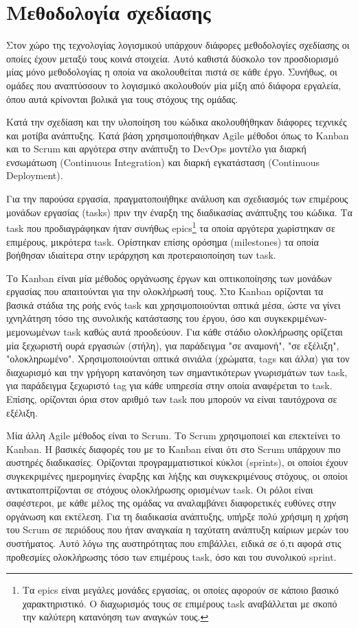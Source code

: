 \section{Μεθοδολογία σχεδίασης} \label{section:3-3-design-methodology}

Στον χώρο της τεχνολογίας λογισμικού υπάρχουν διάφορες μεθοδολογίες σχεδίασης οι οποίες έχουν μεταξύ τους κοινά στοιχεία. Αυτό καθιστά δύσκολο τον προσδιορισμό μίας μόνο μεθοδολογίας η οποία να ακολουθείται πιστά σε κάθε έργο. Συνήθως, οι ομάδες που αναπτύσσουν το λογισμικό ακολουθούν μία μίξη από διάφορα εργαλεία, όπου αυτά κρίνονται βολικά για τους στόχους της ομάδας. %

Κατά την σχεδίαση και την υλοποίηση του κώδικα ακολουθήθηκαν διάφορες τεχνικές και μοτίβα ανάπτυξης. Κατά βάση χρησιμοποιήθηκαν Agile μέθοδοι όπως το Kanban και το Scrum και αργότερα στην ανάπτυξη το DevOps μοντέλο για διαρκή ενσωμάτωση (Continuous Integration) και διαρκή εγκατάσταση (Continuous Deployment).

Για την παρούσα εργασία, πραγματοποιήθηκε ανάλυση και σχεδιασμός των επιμέρους μονάδων εργασίας (tasks) πριν την έναρξη της διαδικασίας ανάπτυξης του κώδικα. Τα task που προδιαγράφηκαν ήταν συνήθως epics\footnote{Τα epics είναι μεγάλες μονάδες εργασίας, οι οποίες αφορούν σε κάποιο βασικό χαρακτηριστικό. Ο διαχωρισμός τους σε επιμέρους task αναβάλλεται με σκοπό την καλύτερη κατανόηση των αναγκών τους.} τα οποία αργότερα χωρίστηκαν σε επιμέρους, μικρότερα task. Ορίστηκαν επίσης ορόσημα (milestones) τα οποία βοήθησαν ιδιαίτερα στην ιεράρχηση και προτεραιοποίηση των task.

Το Kanban είναι μία μέθοδος οργάνωσης έργων και οπτικοποίησης των μονάδων εργασίας που απαιτούνται για την ολοκλήρωσή τους. Στο Kanban ορίζονται τα βασικά στάδια της ροής ενός task και χρησιμοποιούνται οπτικά μέσα, ώστε να γίνει ιχνηλάτηση τόσο της συνολικής κατάστασης του έργου, όσο και συγκεκριμένων-μεμονωμένων task καθώς αυτά προοδεύουν. Για κάθε στάδιο ολοκλήρωσης ορίζεται μία ξεχωριστή ουρά εργασιών (στήλη), για παράδειγμα "σε αναμονή", "σε εξέλιξη", "ολοκληρωμένο". Χρησιμοποιούνται οπτικά σινιάλα (χρώματα, tags και άλλα) για τον διαχωρισμό και την γρήγορη κατανόηση των σημαντικότερων γνωρισμάτων των task, για παράδειγμα ξεχωριστό tag για κάθε υπηρεσία στην οποία αναφέρεται το task. Επίσης, ορίζονται όρια στον αριθμό των task που μπορούν να είναι ταυτόχρονα σε εξέλιξη.

Μία άλλη Agile μέθοδος είναι το Scrum. Το Scrum χρησιμοποιεί και επεκτείνει το Kanban. Η βασικές διαφορές του με το Kanban είναι ότι στο Scrum υπάρχουν πιο αυστηρές διαδικασίες. Ορίζονται προγραμματιστικοί κύκλοι (sprints), οι οποίοι έχουν συγκεκριμένες ημερομηνίες έναρξης και λήξης και συγκεκριμένους στόχους, οι οποίοι αντικατοπτρίζονται σε στόχους ολοκλήρωσης ορισμένων task. Οι ρόλοι είναι σαφέστεροι, με κάθε μέλος της ομάδας να αναλαμβάνει διαφορετικές ευθύνες στην οργάνωση και εκτέλεση. Για τη διαδικασία ανάπτυξης, υπήρξε πολύ χρήσιμη η χρήση του Scrum σε περιόδους που ήταν αναγκαία η ταχύτατη ανάπτυξη καίριων μερών του συστήματος. Αυτό λόγω της αυστηρότητας που επιβάλλει, ειδικά σε ό,τι αφορά στις προθεσμίες ολοκλήρωσης τόσο των επιμέρους task, όσο και του συνολικού sprint.


